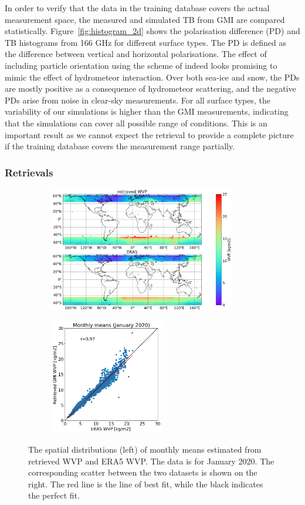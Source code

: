 \documentclass[12pt,oneside,a4paper]{article}
\begin{document}
In order to verify that the data in the training database covers the actual measurement space, the measured and simulated TB from GMI are compared statistically. Figure~\ref{fig:histogram_2d} shows the polarisation difference (PD) and TB histograms from 166 GHz for different surface types. The PD is defined as the difference between vertical and horizontal polarisations. The effect of including particle orientation using the scheme of \citet{baralakas:intro:21} indeed looks promising to mimic the effect of hydrometeor interaction.
Over both sea-ice and snow, the PDs are mostly positive as a consequence of hydrometeor scattering, and the negative PDs arise from noise in clear-sky measurements. For all surface types, the variability of our simulations is higher than the GMI measurements, indicating that the simulations can cover all possible range of conditions. This is an important result as we cannot expect the retrieval to provide a complete picture if the training database covers the measurement range partially.

\subsubsection{Retrievals}

\begin{figure}[t]
	\centering
	\begin{subfigure}{.54\textwidth}
		\includegraphics[height = 55mm]{Figures/WVP_spatial_jan2020.png}
	\end{subfigure}
	\begin{subfigure}{.34\textwidth}
	\includegraphics[height = 50mm]{Figures/WVP_scatter_monthlymean.png} 
	\end{subfigure}
	\caption{The spatial distributions (left) of monthly means estimated from retrieved WVP and ERA5 WVP. The data is for January 2020. The corresponding scatter between the two datasets is shown on the right. The red line is the line of best fit, while the black indicates the perfect fit.}
	\label{fig:WVP_retrievals}
\end{figure}
\end{document}
